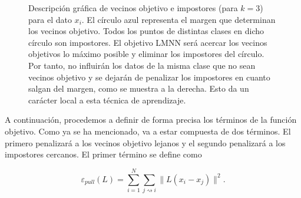 \documentclass{book}
\newcommand{\istargetof}{\rightsquigarrow}
\begin{document}
\begin{figure}[h]
	\centering
	\begin{subfigure}{.5\textwidth}
		\centering
	\end{subfigure}%
	\begin{subfigure}{.5\textwidth}
		\centering
	\end{subfigure}
	\caption{Descripción gráfica de vecinos objetivo e impostores (para $k = 3$) para el dato $x_i$. El círculo azul representa el margen que determinan los vecinos objetivo. Todos los puntos de distintas clases en dicho círculo son impostores. El objetivo LMNN será acercar los vecinos objetivos lo máximo posible y eliminar los impostores del círculo. Por tanto, no influirán los datos de la misma clase que no sean vecinos objetivo y se dejarán de penalizar los impostores en cuanto salgan del margen, como se muestra a la derecha. Esto da un carácter local a esta técnica de aprendizaje.} \label{fig:targets_impostors}
\end{figure}

A continuación, procedemos a definir de forma precisa los términos de la función objetivo. Como ya se ha mencionado, va a estar compuesta de dos términos. El primero penalizará a los vecinos objetivo lejanos y el segundo penalizará a los impostores cercanos. El primer término se define como

\[ \varepsilon_{pull}(L) = \sum_{i=1}^N \sum_{j\istargetof i} \|L(x_i-x_j)\|^2. \]
\end{document}
